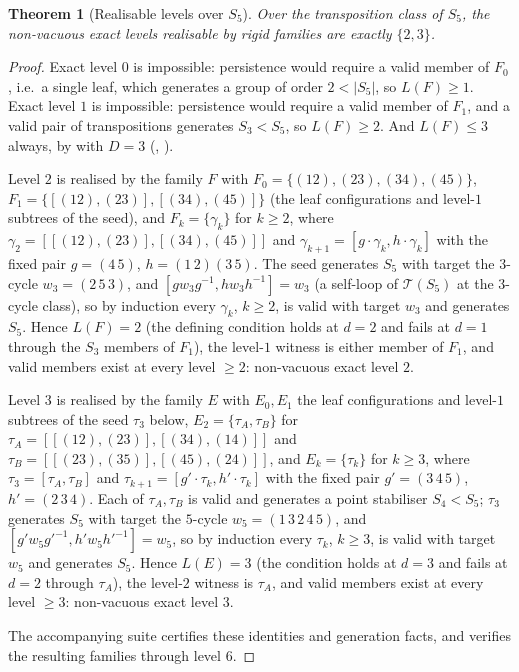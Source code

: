 \documentclass[11pt]{amsart}
\newtheorem{theorem}{Theorem}[section]
\theoremstyle{definition}
\theoremstyle{remark}
\theoremstyle{plain}
\theoremstyle{plain}
\numberwithin{equation}{section}
\begin{document}
\begin{theorem}[Realisable levels over $S_5$]
\label{thm:s5levels}
Over the transposition class of $S_5$, the non-vacuous exact levels realisable by rigid families
are exactly $\{2,3\}$.
\end{theorem}
\begin{proof}
Exact level $0$ is impossible: persistence would require a valid member of $F_0$, i.e.\ a single
leaf, which generates a group of order $2<|S_5|$, so $L(F)\ge1$. Exact level $1$ is impossible:
persistence would require a valid member of $F_1$, and a valid pair of transpositions generates
$S_3<S_5$, so $L(F)\ge2$. And $L(F)\le3$ always, by  with $D=3$
(, ).

Level $2$ is realised by the family $F$ with $F_0=\{(12),(23),(34),(45)\}$,
$F_1=\{[(12),(23)],\allowbreak[(34),(45)]\}$ (the leaf configurations and level-$1$ subtrees of
the seed), and $F_k=\{\gamma_k\}$ for $k\ge2$, where $\gamma_2=[[(12),(23)],[(34),(45)]]$ and
$\gamma_{k+1}=[g\cdot\gamma_k,h\cdot\gamma_k]$ with the fixed pair $g=(4\,5)$,
$h=(1\,2)(3\,5)$. The seed generates $S_5$ with target the $3$-cycle $w_3=(2\,5\,3)$, and
$[gw_3g^{-1},hw_3h^{-1}]=w_3$ (a self-loop of $\mathcal{T}(S_5)$ at the $3$-cycle
class), so by induction every $\gamma_k$, $k\ge2$, is valid with target $w_3$ and generates
$S_5$. Hence $L(F)=2$ (the defining condition holds at $d=2$ and fails at $d=1$ through the
$S_3$ members of $F_1$), the level-$1$ witness is either member of $F_1$, and valid members
exist at every level $\ge2$: non-vacuous exact level $2$.

Level $3$ is realised by the family $E$ with $E_0,E_1$ the leaf configurations and level-$1$
subtrees of the seed $\tau_3$ below, $E_2=\{\tau_A,\tau_B\}$ for
$\tau_A=[[(12),(23)],[(34),(14)]]$ and $\tau_B=[[(23),(35)],[(45),(24)]]$, and
$E_k=\{\tau_k\}$ for $k\ge3$, where $\tau_3=[\tau_A,\tau_B]$ and
$\tau_{k+1}=[g'\cdot\tau_k,h'\cdot\tau_k]$ with the fixed pair $g'=(3\,4\,5)$,
$h'=(2\,3\,4)$. Each of $\tau_A,\tau_B$ is valid and generates a point stabiliser $S_4<S_5$;
$\tau_3$ generates $S_5$ with target the $5$-cycle $w_5=(1\,3\,2\,4\,5)$, and
$[g'w_5g'^{-1},h'w_5h'^{-1}]=w_5$, so by induction every $\tau_k$, $k\ge3$, is valid with
target $w_5$ and generates $S_5$. Hence $L(E)=3$ (the condition holds at $d=3$ and fails at
$d=2$ through $\tau_A$), the level-$2$ witness is $\tau_A$, and valid members exist at every
level $\ge3$: non-vacuous exact level $3$.

The accompanying suite certifies these identities and generation facts,
and verifies the resulting families through level $6$.
\end{proof}
\end{document}
